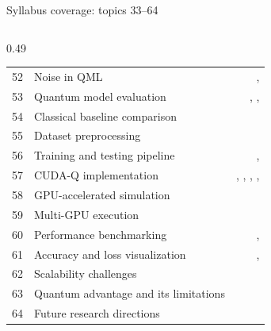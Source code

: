 \documentclass[aspectratio=169,11pt]{beamer}
\begin{document}
\begin{frame}{Syllabus coverage: topics 33--64}
\begin{columns}[T]
\begin{column}{0.49\textwidth}
\begin{tabular}{rlr}
52 & Noise in QML & \pageref{fNoise}, \pageref{fShots} \\
53 & Quantum model evaluation & \pageref{fEval}, \pageref{fBase}, \pageref{fOut} \\
54 & Classical baseline comparison & \pageref{fBase} \\
55 & Dataset preprocessing & \pageref{fData} \\
56 & Training and testing pipeline & \pageref{fData}, \pageref{fTrain} \\
57 & CUDA-Q implementation & \pageref{fStruct}, \pageref{fLayout}, \pageref{fKernel}, \pageref{fTrain}, \pageref{fGlance} \\
58 & GPU-accelerated simulation & \pageref{fTargets} \\
59 & Multi-GPU execution & \pageref{fTargets} \\
60 & Performance benchmarking & \pageref{fScale}, \pageref{fRec} \\
61 & Accuracy and loss visualization & \pageref{fCurves}, \pageref{fOut} \\
62 & Scalability challenges & \pageref{fScaleCh} \\
63 & Quantum advantage and its limitations & \pageref{fAdv} \\
64 & Future research directions & \pageref{fFuture} \\
\bottomrule\end{tabular}
    \end{column}
  \end{columns}
\end{frame}
\end{document}
